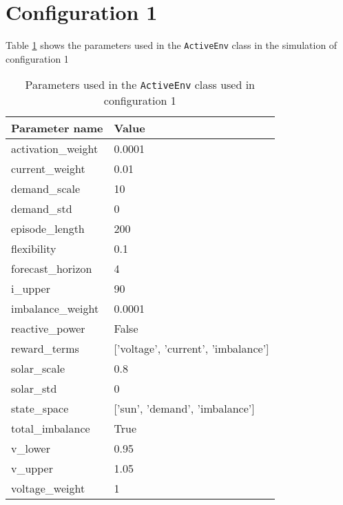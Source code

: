 \documentclass[class=book, crop=false]{standalone}
\begin{document}
\section{Configuration 1}
Table \ref{apendix:config1:params} shows the parameters used in the \texttt{ActiveEnv} class in the simulation of configuration 1

\begin{table}[ht]
\center
\begin{tabular}{ll}
Parameter name     & Value                                     \\
\hline
activation\_weight & 0.0001                                    \\
current\_weight    & 0.01                                      \\
demand\_scale      & 10                                        \\
demand\_std        & 0                                         \\
episode\_length    & 200                                       \\
flexibility        & 0.1                                       \\
forecast\_horizon  & 4                                         \\
i\_upper           & 90                                        \\
imbalance\_weight  & 0.0001                                    \\
reactive\_power    & False                                     \\
reward\_terms      & {[}'voltage',  'current',  'imbalance'{]} \\
solar\_scale       & 0.8                                       \\
solar\_std         & 0                                         \\
state\_space       & {[}'sun', 'demand',  'imbalance'{]}       \\
total\_imbalance   & True                                      \\
v\_lower           & 0.95                                      \\
v\_upper           & 1.05                                      \\
voltage\_weight    & 1                                         \\
\hline
\end{tabular}
\caption{Parameters used in the \texttt{ActiveEnv} class used in configuration 1}
\label{apendix:config1:params}
\end{table}
\end{document}
